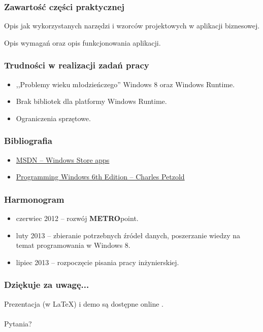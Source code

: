 \documentclass{beamer}
\begin{document}
\begin{frame}
\frametitle{Zawartość części praktycznej}
Opis jak wykorzystanych narzędzi i wzorców projektowych w aplikacji biznesowej.

Opis wymagań oraz opis funkcjonowania aplikacji.
\end{frame}

\begin{frame}
\frametitle{Trudności w realizacji zadań pracy}

\begin{itemize}[<+->]
\item ,,Problemy wieku młodzieńczego'' Windows 8 oraz Windows Runtime.
\item Brak bibliotek dla platformy Windows Runtime.
\item Ograniczenia sprzętowe.

\end{itemize}
\end{frame}


\begin{frame}
\frametitle{Bibliografia} 
\begin{itemize}
\item \href{http://msdn.microsoft.com/en-us/windows/apps/}{MSDN -- Windows Store apps}
\item \href{http://www.charlespetzold.com/blog/2013/01/Programming-Windows-6th-Edition-Final-Ebook-Now-Available.html}{Programming Windows 6th Edition -- Charles Petzold}
\end{itemize}
\end{frame}


\begin{frame}
\frametitle{Harmonogram} 
\begin{itemize}
\item czerwiec 2012 -- rozwój \textbf{METRO}point.
\item luty 2013 -- zbieranie potrzebnych źródeł danych, poszerzanie wiedzy na temat programowania w Windows 8.
\item lipiec 2013 -- rozpoczęcie pisania pracy inżynierskiej.
\end{itemize}
\end{frame}


\begin{frame}
\frametitle{Dziękuje za uwagę...}
Prezentacja (w \LaTeX) i demo są dostępne online \href{http://github.com/soltys}{}. \\
\\
Pytania?

\end{frame}
\end{document}
